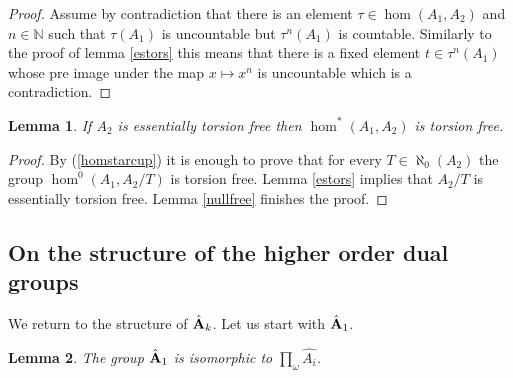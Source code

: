 \documentclass [11pt] {article}
\newtheorem{lemma}{Lemma}[section]
\def\bA{{\bf A}}
\begin{document}
\begin{proof} Assume by contradiction that there is an element $\tau\in\hom(A_1,A_2)$ and $n\in\mathbb{N}$ such that $\tau(A_1)$ is uncountable but $\tau^n(A_1)$ is countable.
Similarly to the proof of lemma \ref{estors} this means that there is a fixed element $t\in\tau^n(A_1)$ whose pre image under the map $x\mapsto x^n$ is uncountable which is a contradiction.
\end{proof}

\begin{lemma}\label{estfree} If $A_2$ is essentially torsion free then $\hom^*(A_1,A_2)$ is torsion free.
\end{lemma}

\begin{proof} By (\ref{homstarcup}) it is enough to prove that for every $T\in\aleph_0(A_2)$ the group $\hom^0(A_1,A_2/T)$ is torsion free. Lemma \ref{estors} implies that $A_2/T$ is essentially torsion free. Lemma \ref{nullfree} finishes the proof.
\end{proof}



\subsection{On the structure of the higher order dual groups}

We return to the structure of $\hat{\bA}_k$.
Let us start with $\hat{\bA}_1$.

\begin{lemma}\label{firstdual} The group $\hat{\bA}_1$ is isomorphic to $\prod_\omega\hat{A_i}$.
\end{lemma}
\end{document}
